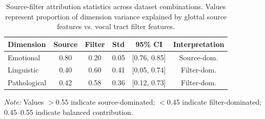 \begin{table}[t]
\centering
\caption{Source-filter attribution statistics across dataset combinations. Values represent proportion of dimension variance explained by glottal source features vs. vocal tract filter features.}
\label{tab:attribution}
\begin{tabular}{lccccc}
\toprule
\textbf{Dimension} & \textbf{Source} & \textbf{Filter} & \textbf{Std} & \textbf{95\% CI} & \textbf{Interpretation} \\
\midrule
Emotional & 0.80 & 0.20 & 0.05 & [0.76, 0.85] & Source-dom. \\
Linguistic & 0.40 & 0.60 & 0.41 & [0.05, 0.74] & Filter-dom. \\
Pathological & 0.42 & 0.58 & 0.36 & [0.12, 0.73] & Filter-dom. \\
\bottomrule
\end{tabular}
\vspace{1mm}
\small\textit{Note:} Values $>$0.55 indicate source-dominated; $<$0.45 indicate filter-dominated; 0.45--0.55 indicate balanced contribution.
\end{table}
